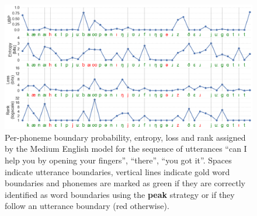 
\begin{figure}
    \centering
    \includegraphics[width=\linewidth]{Figures/15Segmentation/qualitative.png}
    \caption{Per-phoneme boundary probability, entropy, loss and rank assigned by the Medium English model for the sequence of utterances ``can I help you by opening your fingers'', ``there'', ``you got it''. Spaces indicate utterance boundaries, vertical lines indicate gold word boundaries and phonemes are marked as green if they are correctly identified as word boundaries using the \textbf{peak} strategy or if they follow an utterance boundary (red otherwise).}
    \label{fig:15-qualitative}
\end{figure}



